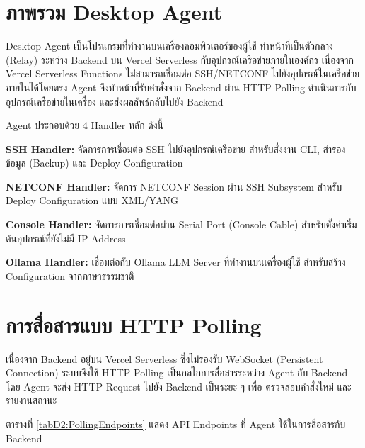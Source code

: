 
\section{ภาพรวม Desktop Agent}
\hspace*{1.3em}
Desktop Agent เป็นโปรแกรมที่ทำงานบนเครื่องคอมพิวเตอร์ของผู้ใช้ ทำหน้าที่เป็นตัวกลาง (Relay) ระหว่าง Backend บน Vercel Serverless กับอุปกรณ์เครือข่ายภายในองค์กร เนื่องจาก Vercel Serverless Functions ไม่สามารถเชื่อมต่อ SSH/NETCONF ไปยังอุปกรณ์ในเครือข่ายภายในได้โดยตรง Agent จึงทำหน้าที่รับคำสั่งจาก Backend ผ่าน HTTP Polling ดำเนินการกับอุปกรณ์เครือข่ายในเครื่อง และส่งผลลัพธ์กลับไปยัง Backend

\hspace*{1.3em}
Agent ประกอบด้วย 4 Handler หลัก ดังนี้

\begin{mycustomenum2}
    \item \textbf{SSH Handler:} จัดการการเชื่อมต่อ SSH ไปยังอุปกรณ์เครือข่าย สำหรับสั่งงาน CLI, สำรองข้อมูล (Backup) และ Deploy Configuration
    \item \textbf{NETCONF Handler:} จัดการ NETCONF Session ผ่าน SSH Subsystem สำหรับ Deploy Configuration แบบ XML/YANG
    \item \textbf{Console Handler:} จัดการการเชื่อมต่อผ่าน Serial Port (Console Cable) สำหรับตั้งค่าเริ่มต้นอุปกรณ์ที่ยังไม่มี IP Address
    \item \textbf{Ollama Handler:} เชื่อมต่อกับ Ollama LLM Server ที่ทำงานบนเครื่องผู้ใช้ สำหรับสร้าง Configuration จากภาษาธรรมชาติ
\end{mycustomenum2}

\section{การสื่อสารแบบ HTTP Polling}
\hspace*{1.3em}
เนื่องจาก Backend อยู่บน Vercel Serverless ซึ่งไม่รองรับ WebSocket (Persistent Connection) ระบบจึงใช้ HTTP Polling เป็นกลไกการสื่อสารระหว่าง Agent กับ Backend โดย Agent จะส่ง HTTP Request ไปยัง Backend เป็นระยะ ๆ เพื่อ ตรวจสอบคำสั่งใหม่ และรายงานสถานะ

\hspace*{1.3em}
ตารางที่ \ref{tabD2:PollingEndpoints} แสดง API Endpoints ที่ Agent ใช้ในการสื่อสารกับ Backend

